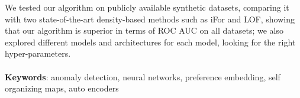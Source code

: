 \hspace{5pt}
We tested our algorithm on publicly available synthetic datasets, comparing it with two state-of-the-art density-based methods such as iFor and LOF, showing that our algorithm is superior in terms of ROC AUC on all datasets; we also explored different models and architectures for each model, looking for the right hyper-parameters.

\paragraph{}
\textbf{Keywords}: anomaly detection, neural networks, preference embedding, self organizing maps, auto encoders